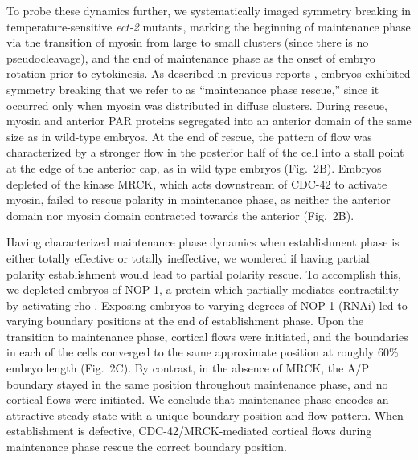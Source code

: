 \documentclass[11pt]{article}
\newcommand{\6}[1]{#1_{\text{6}}}
\newcommand{\3}[1]{#1_{\text{3}}}
\begin{document}
To probe these dynamics further, we systematically imaged symmetry breaking in temperature-sensitive \emph{ect-2} mutants, marking the beginning of maintenance phase via the transition of myosin from large to small clusters (since there is no pseudocleavage), and the end of maintenance phase as the onset of embryo rotation prior to cytokinesis. As described in previous reports \citep{zonies2010symmetry}, embryos exhibited symmetry breaking that we refer to as ``maintenance phase rescue,'' since it occurred only when myosin was distributed in diffuse clusters. During rescue, myosin and anterior PAR proteins segregated into an anterior domain of the same size as in wild-type embryos. At the end of rescue, the pattern of flow was characterized by a stronger flow in the posterior half of the cell into a stall point at the edge of the anterior cap, as in wild type embryos (Fig.\ 2B). Embryos depleted of the kinase MRCK, which acts downstream of CDC-42 to activate myosin, failed to rescue polarity in maintenance phase, as neither the anterior domain nor myosin domain contracted towards the anterior (Fig.\ 2B).

Having characterized maintenance phase dynamics when establishment phase is either totally effective or totally ineffective, we wondered if having partial polarity establishment would lead to partial polarity rescue. To accomplish this, we depleted embryos of NOP-1, a protein which partially mediates contractility by activating rho \citep{tse2012rhoa}. Exposing embryos to varying degrees of NOP-1 (RNAi) led to varying boundary positions at the end of establishment phase. Upon the transition to maintenance phase, cortical flows were initiated, and the boundaries in each of the cells converged to the same approximate position at roughly 60\% embryo length (Fig.\ 2C). By contrast, in the absence of MRCK, the A/P boundary stayed in the same position throughout maintenance phase, and no cortical flows were initiated. We conclude that maintenance phase encodes an attractive steady state with a unique boundary position and flow pattern. When establishment is defective, CDC-42/MRCK-mediated cortical flows during maintenance phase rescue the correct boundary position.
\end{document}
